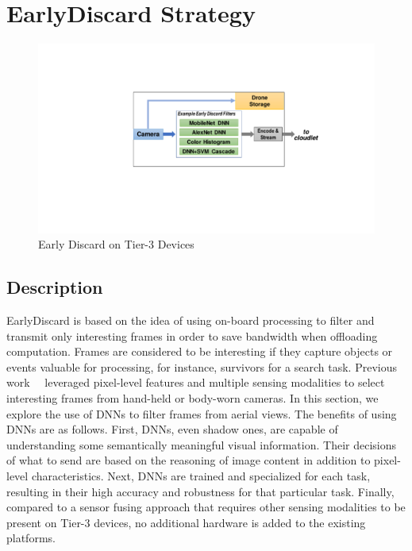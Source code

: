 
\section{{\xc EarlyDiscard} Strategy}
\label{sec:earlydiscard}

\begin{figure}
\includegraphics[trim={9cm 6.5cm 5cm 4.8cm},clip,width=\linewidth]{FIGS/fig-ondrone-early-discard.pdf}
\caption{Early Discard on Tier-3 Devices}
\label{fig:ondrone}
\vspace{-0.2in}
\end{figure}


\subsection{Description}
EarlyDiscard is based on the idea of using on-board processing to filter and
transmit only interesting frames in order to save bandwidth when offloading
computation. Frames are considered to be interesting if they capture objects or
events valuable for processing, for instance, survivors for a search task.
Previous work~\cite{Hu2015}~\cite{Naderiparizi2017} leveraged pixel-level
features and multiple sensing modalities to select interesting frames from
hand-held or body-worn cameras. In this section, we explore the use of DNNs to
filter frames from aerial views. The benefits of using DNNs are as follows.
First, DNNs, even shadow ones, are capable of understanding some semantically
meaningful visual information. Their decisions of what to send are based on the
reasoning of image content in addition to pixel-level characteristics. Next,
DNNs are trained and specialized for each task, resulting in their high accuracy
and robustness for that particular task. Finally, compared to a sensor fusing
approach that requires other sensing modalities to be present on Tier-3 devices,
no additional hardware is added to the existing platforms.

